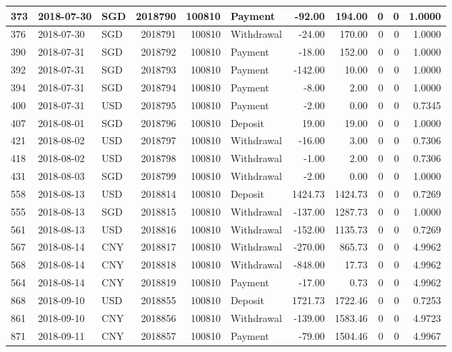 \documentclass[]{article}
\begin{document}
\begin{table}[H]
\begin{tabular}{l|l|l|r|r|l|r|r|r|r|r}
\hline
373 & 2018-07-30 & SGD & 2018790 & 100810 & Payment & -92.00 & 194.00 & 0 & 0 & 1.0000\\
\hline
376 & 2018-07-30 & SGD & 2018791 & 100810 & Withdrawal & -24.00 & 170.00 & 0 & 0 & 1.0000\\
\hline
390 & 2018-07-31 & SGD & 2018792 & 100810 & Payment & -18.00 & 152.00 & 0 & 0 & 1.0000\\
\hline
392 & 2018-07-31 & SGD & 2018793 & 100810 & Payment & -142.00 & 10.00 & 0 & 0 & 1.0000\\
\hline
394 & 2018-07-31 & SGD & 2018794 & 100810 & Payment & -8.00 & 2.00 & 0 & 0 & 1.0000\\
\hline
400 & 2018-07-31 & USD & 2018795 & 100810 & Payment & -2.00 & 0.00 & 0 & 0 & 0.7345\\
\hline
407 & 2018-08-01 & SGD & 2018796 & 100810 & Deposit & 19.00 & 19.00 & 0 & 0 & 1.0000\\
\hline
421 & 2018-08-02 & USD & 2018797 & 100810 & Withdrawal & -16.00 & 3.00 & 0 & 0 & 0.7306\\
\hline
418 & 2018-08-02 & USD & 2018798 & 100810 & Withdrawal & -1.00 & 2.00 & 0 & 0 & 0.7306\\
\hline
431 & 2018-08-03 & SGD & 2018799 & 100810 & Withdrawal & -2.00 & 0.00 & 0 & 0 & 1.0000\\
\hline
558 & 2018-08-13 & USD & 2018814 & 100810 & Deposit & 1424.73 & 1424.73 & 0 & 0 & 0.7269\\
\hline
555 & 2018-08-13 & SGD & 2018815 & 100810 & Withdrawal & -137.00 & 1287.73 & 0 & 0 & 1.0000\\
\hline
561 & 2018-08-13 & USD & 2018816 & 100810 & Withdrawal & -152.00 & 1135.73 & 0 & 0 & 0.7269\\
\hline
567 & 2018-08-14 & CNY & 2018817 & 100810 & Withdrawal & -270.00 & 865.73 & 0 & 0 & 4.9962\\
\hline
568 & 2018-08-14 & CNY & 2018818 & 100810 & Withdrawal & -848.00 & 17.73 & 0 & 0 & 4.9962\\
\hline
564 & 2018-08-14 & CNY & 2018819 & 100810 & Payment & -17.00 & 0.73 & 0 & 0 & 4.9962\\
\hline
868 & 2018-09-10 & USD & 2018855 & 100810 & Deposit & 1721.73 & 1722.46 & 0 & 0 & 0.7253\\
\hline
861 & 2018-09-10 & CNY & 2018856 & 100810 & Withdrawal & -139.00 & 1583.46 & 0 & 0 & 4.9723\\
\hline
871 & 2018-09-11 & CNY & 2018857 & 100810 & Payment & -79.00 & 1504.46 & 0 & 0 & 4.9967\\

\end{tabular}
\end{table}
\end{document}
